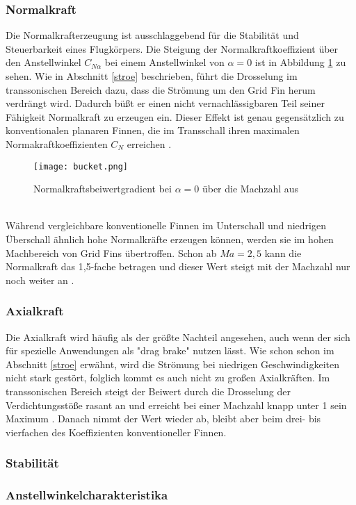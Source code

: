 \subsubsection{Normalkraft}
Die Normalkrafterzeugung ist ausschlaggebend für die Stabilität und Steuerbarkeit eines Flugkörpers. Die Steigung der Normalkraftkoeffizient über den Anstellwinkel $C_{N\alpha}$ bei einem Anstellwinkel von $\alpha = 0$ ist in Abbildung \ref{abb_bucket} zu sehen. Wie in Abschnitt \ref{stroe} beschrieben, führt die Drosselung im transsonischen Bereich dazu, dass die Strömung um den Grid Fin herum verdrängt wird. Dadurch büßt er einen nicht vernachlässigbaren Teil seiner Fähigkeit Normalkraft zu erzeugen ein. Dieser Effekt ist genau gegensätzlich zu konventionalen planaren Finnen, die im Transschall ihren maximalen Normakraftkoeffizienten $C_N$ erreichen \cite{synopsis}.
\begin{figure}[h]
	\centering
	\texttt{[image: bucket.png]}
	\caption{Normalkraftsbeiwertgradient bei $\alpha = 0$ über die Machzahl aus \cite{synopsis}}
	\label{abb_bucket}
\end{figure}\\
Während vergleichbare konventionelle Finnen im Unterschall und niedrigen Überschall ähnlich hohe Normalkräfte erzeugen können, werden sie im hohen Machbereich von Grid Fins übertroffen. Schon ab $Ma=2,5$ kann die Normalkraft das 1,5-fache betragen und dieser Wert steigt mit der Machzahl nur noch weiter an \cite{synopsis,vergleichPlanarNATO}.
\subsubsection{Axialkraft}
Die Axialkraft wird häufig als der größte Nachteil angesehen, auch wenn der sich für spezielle Anwendungen als "drag brake" nutzen lässt. Wie schon schon im Abschnitt \ref{stroe} erwähnt, wird die Strömung bei niedrigen Geschwindigkeiten nicht stark gestört, folglich kommt es auch nicht zu großen Axialkräften. Im transsonischen Bereich steigt der Beiwert durch die Drosselung der Verdichtungsstöße rasant an und erreicht bei einer Machzahl knapp unter 1 sein Maximum \cite{solver}. Danach nimmt der Wert wieder ab, bleibt aber beim drei- bis vierfachen des Koeffizienten konventioneller Finnen.
\subsubsection{Stabilität}
\subsubsection{Anstellwinkelcharakteristika}
